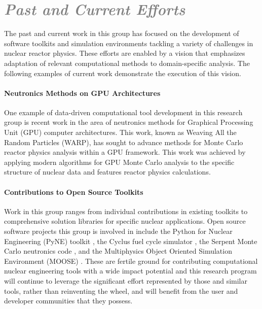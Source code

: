 \documentclass[a4paper, 12pt]{article}
\begin{document}
\section*{\textcolor{gray}{\it Past and Current Efforts}}

The past and current work in this group has focused on the development of 
software toolkits and simulation environments tackling a variety of challenges 
in nuclear reactor physics. These efforts are enabled by a vision that 
emphasizes adaptation of relevant computational methods to domain-specific 
analysis. The following examples of current work demonstrate the 
execution of this vision.

\paragraph{Neutronics Methods on GPU Architectures}

One example of data-driven computational tool development in this research group 
is recent work in the area of neutronics methods for Graphical Processing Unit 
(GPU) computer architectures. This work, known as Weaving All the Random 
Particles (WARP), has sought to advance methods for Monte Carlo reactor physics 
analysis within a GPU framework. This work was achieved by applying modern 
algorithms for GPU Monte Carlo analysis to the specific structure of nuclear 
data and features reactor physics calculations.



\paragraph{Contributions to Open Source Toolkits}

Work in this group ranges from individual contributions in existing toolkits to 
comprehensive solution libraries for specific nuclear applications.  Open source 
software projects this group is involved in include the Python for Nuclear 
Engineering (PyNE) toolkit \cite{pyne_pyne_2011}, the Cyclus fuel cycle 
simulator \cite{huff_cyclus_2011}, the Serpent Monte Carlo neutronics code 
\cite{leppanen_serpentcontinuous-energy_2012}, and the Multiphysics Object Oriented Simulation 
Environment (MOOSE) \cite{gaston_moose:_2009}. These are fertile ground for 
contributing computational nuclear engineering tools with a wide impact 
potential and this research program will continue to leverage the significant 
effort represented by those and similar tools, rather than reinventing the 
wheel, and will benefit from the user and developer communities that they 
possess.  
\end{document}
